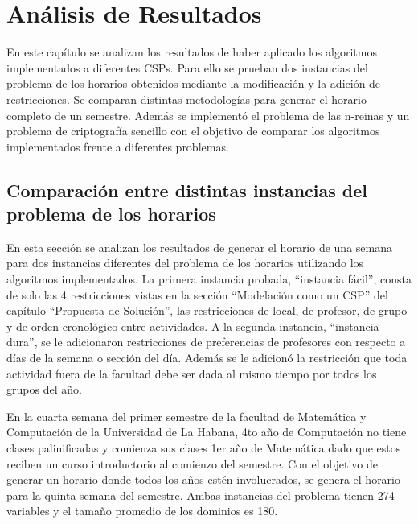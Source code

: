 \chapter{An\'alisis de Resultados}

En este cap\'itulo se analizan los resultados de haber aplicado los algoritmos implementados a diferentes CSPs. Para ello se prueban dos instancias del problema de los horarios obtenidos mediante la modificaci\'on y la adici\'on de restricciones. Se comparan distintas metodolog\'ias para generar el horario completo de un semestre. Adem\'as se implement\'o el problema de las n-reinas y un problema de criptograf\'ia sencillo con el objetivo de comparar los algoritmos implementados frente a diferentes problemas.

\section{Comparaci\'on entre distintas instancias del problema de los horarios}

En esta secci\'on se analizan los resultados de generar el horario de una semana para dos instancias diferentes del problema de los horarios utilizando los algoritmos implementados. La primera instancia probada, ``instancia f\'acil'', consta de solo las 4 restricciones vistas en la secci\'on ``Modelaci\'on como un CSP'' del cap\'itulo ``Propuesta de Solución'', las restricciones de local, de profesor, de grupo y de orden cronol\'ogico entre actividades. A la segunda instancia, ``instancia dura'', se le adicionaron restricciones de preferencias de profesores con respecto a d\'ias de la semana o secci\'on del d\'ia. Adem\'as se le adicion\'o la restricci\'on que toda actividad fuera de la facultad debe ser dada al mismo tiempo por todos los grupos del año.

En la cuarta semana del primer semestre de la facultad de Matem\'atica y Computaci\'on de la Universidad de La Habana, 4to año de Computaci\'on no tiene clases palinificadas y comienza sus clases 1er año de Matem\'atica dado que estos reciben un curso introductorio al comienzo del semestre. Con el objetivo de generar un horario donde todos los años est\'en involucrados, se genera el horario para la quinta semana del semestre. Ambas instancias del problema tienen 274 variables y el tamaño promedio de los dominios es 180.


